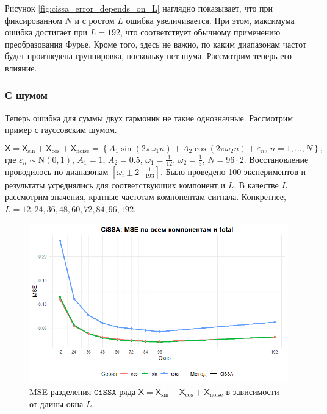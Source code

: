 \documentclass[12pt, specialist, subf
]{disser}
\theoremstyle{definition}
\newcommand{\CISSA}{\texttt{CiSSA}}
\newcommand{\TS}{\mathsf{X}}
\begin{document}
Рисунок \ref{fig:cissa_error_depends_on_L} наглядно показывает, что при фиксированном $N$ и с ростом $L$ ошибка увеличивается. При этом, максимума ошибка достигает при $L = 192$, что соответствует обычному применению преобразования Фурье. Кроме того, здесь не важно, по каким диапазонам частот будет произведена группировка, поскольку нет шума. Рассмотрим теперь его влияние.


\subsubsection*{С шумом}

Теперь ошибка для суммы двух гармоник не такие однозначные. Рассмотрим пример с гауссовским шумом.

\[
\TS = \TS_{\sin} + \TS_{\cos} +\TS_{\mathrm{noise}} = \left\{  
A_1 \sin(2\pi \omega_1 n ) + A_2  \cos(2\pi \omega_2 n ) + \varepsilon_n, \, n = 1, \dots, N
\right\},
\] где $\varepsilon_n \sim \mathrm N(0, 1)$, $A_1 = 1$, $A_2 = 0.5$, $\omega_1 = \frac{1}{12}$, $\omega_2 = \frac{1}{3}$, $N = 96 \cdot 2$. Восстановление проводилось по диапазонам $[\omega_i \pm 2 \cdot \frac{1}{193}]$. Было проведено 100 экспериментов и результаты усреднялись для соответствующих компонент и $L$. В качестве $L$ рассмотрим значения, кратные частотам компонентам сигнала. Конкретнее,  $L = 12, 24, 36, 48, 60, 72, 84, 96, 192$.


\begin{figure}[H]
	\centering
	\includegraphics[width=1\textwidth]{img/cissa_errors_plot_cos_noised.png}
	\caption{MSE разделения $\CISSA$ ряда $\TS = \TS_{\sin} + \TS_{\cos} +\TS_{\mathrm{noise}}$ в зависимости от длины окна $L$.}
	\label{fig:cissa_error_cos_noised_depends_on_L}
\end{figure}
\end{document}
